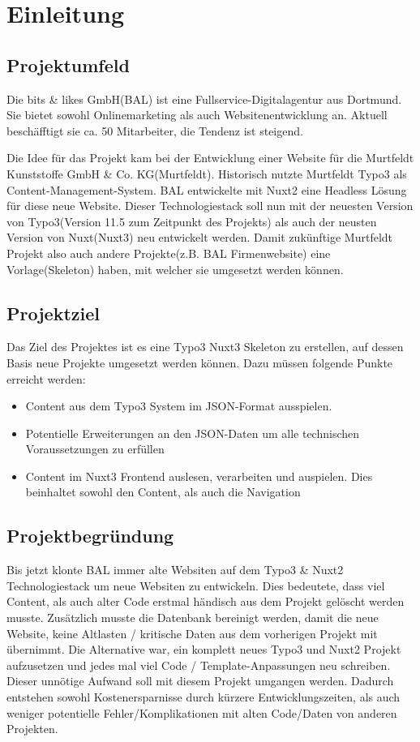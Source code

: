 \section{Einleitung}
\label{sec:Einleitung}


\subsection{Projektumfeld} 
\label{sec:Projektumfeld}
Die bits \& likes GmbH(\acs{BAL}) ist eine Fullservice-Digitalagentur aus Dortmund. Sie bietet sowohl Onlinemarketing als auch Websitenentwicklung an. Aktuell beschäfftigt sie ca. 50 Mitarbeiter, die Tendenz ist steigend.

Die Idee für das Projekt kam bei der Entwicklung einer Website für die Murtfeldt Kunststoffe GmbH \& Co. KG(Murtfeldt). Historisch nutzte Murtfeldt Typo3 als Content-Management-System. \acs{BAL} entwickelte mit Nuxt2 eine Headless Lösung für diese neue Website. Dieser Technologiestack soll nun mit der neuesten Version von Typo3(Version 11.5 zum Zeitpunkt des Projekts) als auch der neusten Version von Nuxt(Nuxt3) neu entwickelt werden. Damit zukünftige Murtfeldt Projekt also auch andere Projekte(z.B. \acs{BAL} Firmenwebsite) eine Vorlage(Skeleton) haben, mit welcher sie umgesetzt werden können.


\subsection{Projektziel} 
\label{sec:Projektziel}
Das Ziel des Projektes ist es eine Typo3 Nuxt3 Skeleton zu erstellen, auf dessen Basis neue Projekte umgesetzt werden können. Dazu müssen folgende Punkte erreicht werden:
\begin{itemize}
	\item Content aus dem Typo3 System im JSON-Format ausspielen.
	\item Potentielle Erweiterungen an den JSON-Daten um alle technischen Voraussetzungen zu erfüllen
	\item Content im Nuxt3 Frontend auslesen, verarbeiten und auspielen. Dies beinhaltet sowohl den Content, als auch die Navigation
\end{itemize}

\subsection{Projektbegründung} 
\label{sec:Projektbegruendung}
Bis jetzt klonte \acs{BAL} immer alte Websiten auf dem Typo3 \& Nuxt2 Technologiestack um neue Websiten zu entwickeln. Dies bedeutete, dass viel Content, als auch alter Code erstmal händisch aus dem Projekt gelöscht werden musste. Zusätzlich musste die Datenbank bereinigt werden, damit die neue Website, keine Altlasten / kritische Daten aus dem vorherigen Projekt mit übernimmt. Die Alternative war, ein komplett neues Typo3 und Nuxt2 Projekt aufzusetzen und jedes mal viel Code / Template-Anpassungen neu schreiben. Dieser unnötige Aufwand soll mit diesem Projekt umgangen werden. Dadurch entstehen sowohl Kostenersparnisse durch kürzere Entwicklungszeiten, als auch weniger potentielle Fehler/Komplikationen mit alten Code/Daten von anderen Projekten.

